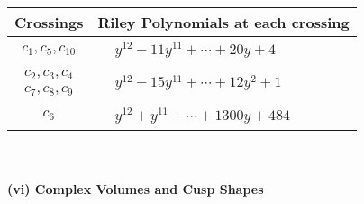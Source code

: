 \documentclass[1p]{elsarticle_modified}
\theoremstyle{definition}
\begin{document}
\begin{tabular}{m{50pt}|m{274pt}}
Crossings & \hspace{64pt}Riley Polynomials at each crossing \\
\hline $$\begin{aligned}c_{1},c_{5},c_{10}\end{aligned}$$&$\begin{aligned}
&y^{12}-11 y^{11}+\cdots+20 y+4
\end{aligned}$\\
\hline $$\begin{aligned}c_{2},c_{3},c_{4}\\c_{7},c_{8},c_{9}\end{aligned}$$&$\begin{aligned}
&y^{12}-15 y^{11}+\cdots+12 y^2+1
\end{aligned}$\\
\hline $$\begin{aligned}c_{6}\end{aligned}$$&$\begin{aligned}
&y^{12}+y^{11}+\cdots+1300 y+484
\end{aligned}$\\
\hline
\end{tabular}\\~\\
\newpage\flushleft \textbf{(vi) Complex Volumes and Cusp Shapes}
\end{document}
